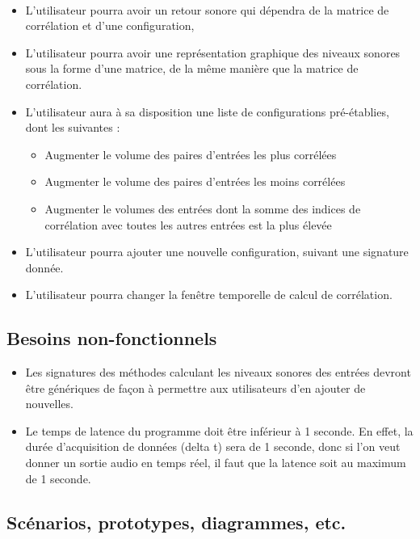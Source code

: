 \documentclass{article}
\begin{document}
    \paragraph{}
    \begin{itemize}
      \item L'utilisateur pourra avoir un retour sonore qui dépendra de la
      matrice de corrélation et d'une configuration,
      \item L'utilisateur pourra avoir une représentation graphique des niveaux
      sonores sous la forme d'une matrice, de la même manière que la matrice de
      corrélation.
      \item L'utilisateur aura à sa disposition une liste de configurations
      pré-établies, dont les suivantes :
      \begin{itemize}
        \item Augmenter le volume des paires d'entrées les plus corrélées
        \item Augmenter le volume des paires d'entrées les moins corrélées
        \item Augmenter le volumes des entrées dont la somme des indices de corrélation avec toutes les autres entrées est la plus élevée
      \end{itemize}
      \item L'utilisateur pourra ajouter une nouvelle configuration, suivant
      une signature donnée.
      \item L'utilisateur pourra changer la fenêtre temporelle de calcul de
      corrélation.
    \end{itemize}
    \subsection{Besoins non-fonctionnels}
    \begin{itemize}
      \item Les signatures des méthodes calculant les niveaux sonores des
      entrées devront être génériques de façon à permettre aux utilisateurs d'en
      ajouter de nouvelles.
      \item Le temps de latence du programme doit être inférieur à 1 seconde.
      En effet, la durée d'acquisition de données (delta t) sera de 1 seconde,
      donc si l'on veut donner un sortie audio en temps réel, il faut que la latence
      soit au maximum de 1 seconde.
    \end{itemize}
    \subsection{Scénarios, prototypes, diagrammes, etc.}
\end{document}
